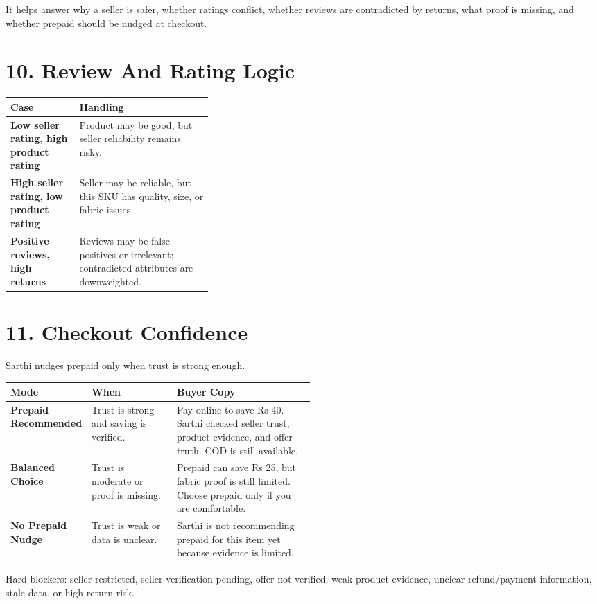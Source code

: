 \documentclass[11pt,a4paper,landscape]{article}
\newcommand{\tagline}[1]{\vspace{0.25em}\noindent\textcolor{sarthiMuted}{#1}\vspace{0.6em}}
\begin{document}
It helps answer why a seller is safer, whether ratings conflict, whether reviews are contradicted by returns, what proof is missing, and whether prepaid should be nudged at checkout.

\section{10. Review And Rating Logic}
\begin{tabularx}{\linewidth}{>{\bfseries}p{0.34\linewidth}X}
\toprule
Case & Handling\\
\midrule
Low seller rating, high product rating & Product may be good, but seller reliability remains risky.\\
High seller rating, low product rating & Seller may be reliable, but this SKU has quality, size, or fabric issues.\\
Positive reviews, high returns & Reviews may be false positives or irrelevant; contradicted attributes are downweighted.\\
\bottomrule
\end{tabularx}

\section{11. Checkout Confidence}
Sarthi nudges prepaid only when trust is strong enough.

\begin{tabularx}{\linewidth}{>{\bfseries}p{0.23\linewidth}p{0.28\linewidth}X}
\toprule
Mode & When & Buyer Copy\\
\midrule
Prepaid Recommended & Trust is strong and saving is verified. & Pay online to save Rs 40. Sarthi checked seller trust, product evidence, and offer truth. COD is still available.\\
Balanced Choice & Trust is moderate or proof is missing. & Prepaid can save Rs 25, but fabric proof is still limited. Choose prepaid only if you are comfortable.\\
No Prepaid Nudge & Trust is weak or data is unclear. & Sarthi is not recommending prepaid for this item yet because evidence is limited.\\
\bottomrule
\end{tabularx}

\tagline{Hard blockers: seller restricted, seller verification pending, offer not verified, weak product evidence, unclear refund/payment information, stale data, or high return risk.}
\end{document}
